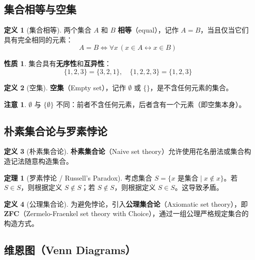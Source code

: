 \documentclass[UTF8,11pt,a4paper]{ctexbook}   %
\theoremstyle{definition}
\newtheorem{definition}{定义}[section]
\newtheorem{theorem}{定理}[section]
\newtheorem{property}{性质}[section]
\newtheorem{warning}{注意}[section]
\begin{document}
\subsection{集合相等与空集}

\begin{definition}[集合相等]
两个集合 $A$ 和 $B$ \textbf{相等}（equal），记作 $A = B$，当且仅当它们具有完全相同的元素：
\[
A = B \iff \forall x\,(x \in A \leftrightarrow x \in B)
\]
\end{definition}

\begin{property}
集合具有\textbf{无序性}和\textbf{互异性}：
\[
\{1, 2, 3\} = \{3, 2, 1\}, \quad \{1, 2, 2, 3\} = \{1, 2, 3\}
\]
\end{property}

\begin{definition}[空集]
\textbf{空集}（Empty set），记作 $\emptyset$ 或 $\{\}$，是不含任何元素的集合。
\end{definition}

\begin{warning}
$\emptyset$ 与 $\{\emptyset\}$ 不同：前者不含任何元素，后者含有一个元素（即空集本身）。
\end{warning}

\subsection{朴素集合论与罗素悖论}

\begin{definition}[朴素集合论]
\textbf{朴素集合论}（Naive set theory）允许使用花名册法或集合构造记法随意构造集合。
\end{definition}

\begin{theorem}[罗素悖论 / Russell's Paradox]
考虑集合 $S = \{x \text{ 是集合} \mid x \notin x\}$。若 $S \in S$，则根据定义 $S \notin S$；若 $S \notin S$，则根据定义 $S \in S$。这导致矛盾。
\end{theorem}

\begin{definition}[公理集合论]
为避免悖论，引入\textbf{公理集合论}（Axiomatic set theory），即 \textbf{ZFC}（Zermelo-Fraenkel set theory with Choice），通过一组公理严格规定集合的构造方式。
\end{definition}

\subsection{维恩图（Venn Diagrams）}
\end{document}
